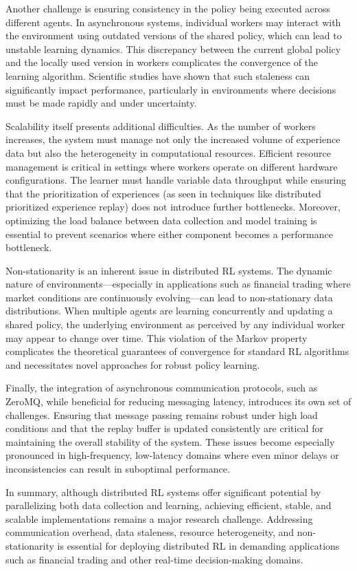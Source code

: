 Another challenge is ensuring consistency in the policy being executed across different agents.
In asynchronous systems, individual workers may interact with the environment using outdated versions of the shared policy,
which can lead to unstable learning dynamics.
This discrepancy between the current global policy and the locally used version in workers complicates the convergence of the learning algorithm.
Scientific studies have shown that such staleness can significantly impact performance,
particularly in environments where decisions must be made rapidly and under uncertainty.


Scalability itself presents additional difficulties.
As the number of workers increases, the system must manage not only the increased volume of experience data but
also the heterogeneity in computational resources.
Efficient resource management is critical in settings where workers operate on different hardware configurations.
The learner must handle variable data throughput while ensuring that the prioritization of experiences
(as seen in techniques like distributed prioritized experience replay) does not introduce further bottlenecks.
Moreover, optimizing the load balance between data collection and model training is essential to
prevent scenarios where either component becomes a performance bottleneck.

Non-stationarity is an inherent issue in distributed RL systems.
The dynamic nature of environments—especially in applications such as financial trading where market conditions are
continuously evolving—can lead to non-stationary data distributions.
When multiple agents are learning concurrently and updating a shared policy, the underlying environment as perceived by
any individual worker may appear to change over time.
This violation of the Markov property complicates the theoretical guarantees of convergence for standard RL algorithms and
necessitates novel approaches for robust policy learning.

Finally, the integration of asynchronous communication protocols, such as ZeroMQ, while beneficial for reducing messaging latency,
introduces its own set of challenges.
Ensuring that message passing remains robust under high load conditions and that the replay buffer is updated consistently are
critical for maintaining the overall stability of the system.
These issues become especially pronounced in high-frequency,
low-latency domains where even minor delays or inconsistencies can result in suboptimal performance.

In summary, although distributed RL systems offer significant potential by parallelizing both data collection and learning,
achieving efficient, stable, and scalable implementations remains a major research challenge.
Addressing communication overhead, data staleness, resource heterogeneity,
and non-stationarity is essential for deploying distributed RL in demanding applications such as financial trading and other real-time decision-making domains.
